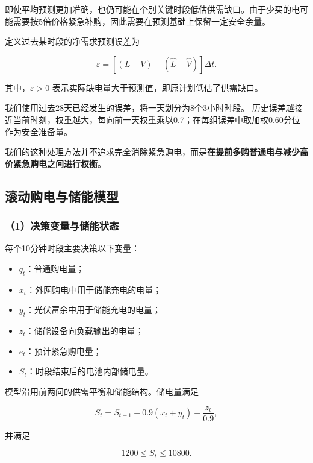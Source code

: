 即使平均预测更加准确，也仍可能在个别关键时段低估供需缺口。由于少买的电可能需要按5倍价格紧急补购，因此需要在预测基础上保留一定安全余量。

定义过去某时段的净需求预测误差为

\begin{equation}
\varepsilon
=
\left[
(L-V)-(\widehat L-\widehat V)
\right]\Delta t.
\end{equation}

其中，$\varepsilon>0$ 表示实际缺电量大于预测值，即原计划低估了供需缺口。

我们使用过去28天已经发生的误差，将一天划分为8个3小时时段。
历史误差越接近当前时刻，权重越大，每向前一天权重乘以0.7；在每组误差中取加权0.60分位作为安全准备量。

我们的这种处理方法并不追求完全消除紧急购电，而是\textbf{在提前多购普通电与减少高价紧急购电之间进行权衡}。


\subsection{滚动购电与储能模型}

\subsubsection*{（1）决策变量与储能状态}

每个10分钟时段主要决策以下变量：

\begin{itemize}
    \item $q_t$：普通购电量；
    \item $x_t$：外网购电中用于储能充电的电量；
    \item $y_t$：光伏富余中用于储能充电的电量；
    \item $z_t$：储能设备向负载输出的电量；
    \item $e_t$：预计紧急购电量；
    \item $S_t$：时段结束后的电池内部储电量。
\end{itemize}

模型沿用前两问的供需平衡和储能结构。储电量满足

\begin{equation}
S_t
=
S_{t-1}
+
0.9(x_t+y_t)
-
\frac{z_t}{0.9},
\end{equation}

并满足

\begin{equation}
1200\leq S_t\leq10800.
\end{equation}

